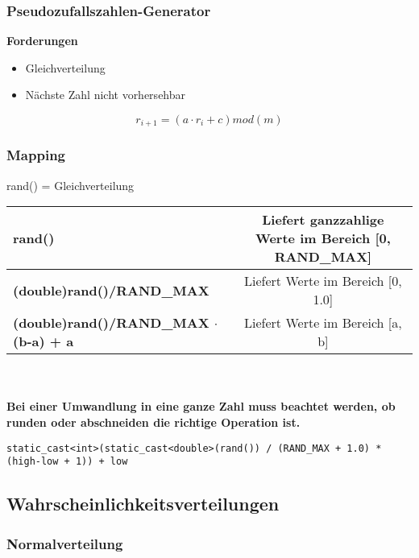 \subsubsection{Pseudozufallszahlen-Generator}

\textbf{Forderungen}
\begin{itemize}
	\item Gleichverteilung
	\item Nächste Zahl nicht vorhersehbar
\end{itemize}
\begin{equation}
	r_{i+1} = (a \cdot r_i + c)mod (m)
\end{equation}

\subsubsection{Mapping}
rand() = Gleichverteilung\\

\begin{tabular}{|l|c|}
	\hline
	\textbf{rand()}                              & Liefert ganzzahlige Werte im Bereich [0, RAND\_MAX] \\ \hline
	\textbf{(double)rand()/RAND\_MAX}            &         Liefert Werte im Bereich [0, 1.0]          \\ \hline
	\textbf{(double)rand()/RAND\_MAX $\cdot$(b-a) + a} &          Liefert Werte im Bereich [a, b]           \\ \hline
\end{tabular} \\\\

\textbf{Bei einer Umwandlung in eine ganze Zahl muss beachtet werden, ob runden oder abschneiden die richtige Operation ist.}\\

\begin{lstlisting}
static_cast<int>(static_cast<double>(rand()) / (RAND_MAX + 1.0) * (high-low + 1)) + low
\end{lstlisting}


\subsection{Wahrscheinlichkeitsverteilungen}

\subsubsection{Normalverteilung}
